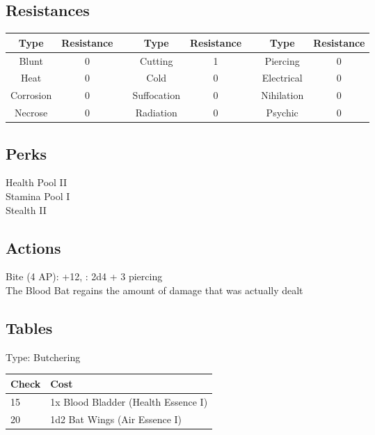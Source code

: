 \subsection{Resistances}
\begin{minipage}[H]{1\textwidth}
	\centering
	\begin{tabular}[c]{|c | c | c | c | c | c | c | c|}
		\hline
		Type & Resistance && Type & Resistance && Type & Resistance\\
		\hline
		Blunt & 0 &&
		Cutting & 1 &&
		Piercing & 0\\
		Heat & 0 &&
		Cold & 0 &&
		Electrical & 0\\
		Corrosion & 0 &&
		Suffocation & 0 &&
		Nihilation & 0 \\
		Necrose & 0 &&
		Radiation & 0 &&
		Psychic & 0\\
		\hline
	\end{tabular}
\end{minipage}

\subsection{Perks}
Health Pool II\\
Stamina Pool I\\
Stealth II\\

\subsection{Actions}
Bite (4 AP): +12, : 2d4 + 3 piercing\\
The Blood Bat regains the amount of damage that was actually dealt

\subsection{Tables}
Type: Butchering
\\
\begin{minipage}{0.8\textwidth}
	\begin{tabular}{|l | l|}
		\hline
		Check & Cost\\
		\hline
		15 & 1x Blood Bladder (Health Essence I)\\
		20 & 1d2 Bat Wings (Air Essence I)\\
		\hline
	\end{tabular}
\end{minipage}
\pagebreak